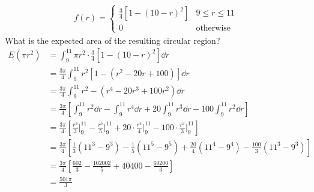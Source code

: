 \documentclass[letterpaper,12pt]{article}
\begin{document}
\begin{enumerate}
    \begin{align*}
      f(r) = \begin{cases}
        \frac{3}{4}[1 - (10 - r)^2] & 9 \le r \le 11 \\
        0                           & \text{otherwise}
      \end{cases}
    \end{align*}
    What is the expected area of the resulting circular region?
    \begin{align*}
      E(\pi r^2) &= \int_{9}^{11} \pi r^2 \cdot \frac{3}{4}[1 - (10 - r)^2] \dd{r} \\
      &= \frac{3\pi}{4} \int_{9}^{11} r^2 [1 - (r^2 - 20r + 100)] \dd{r} \\
      &= \frac{3\pi}{4} \int_{9}^{11} r^2 - (r^4 - 20r^3 + 100r^2) \dd{r} \\
      &= \frac{3\pi}{4} \left[\int_{9}^{11} r^2 \dd{r} - \int_{9}^{11} r^4 \dd{r} + 20\int_{9}^{11} r^3 \dd{r} - 100\int_{9}^{11} r^2 \dd{r}\right] \\
      &= \frac{3\pi}{4} \left[\frac{r^3}{3} \bigg\rvert_{9}^{11} - \frac{r^5}{5} \bigg\rvert_{9}^{11} + 20 \cdot \frac{r^4}{4} \bigg\rvert_{9}^{11} - 100 \cdot \frac{r^3}{3} \bigg\rvert_{9}^{11}\right] \\
      &= \frac{3\pi}{4} \left[\frac{1}{3}(11^3 - 9^3) - \frac{1}{5}(11^5 - 9^5) + \frac{20}{4}(11^4 - 9^4) - \frac{100}{3}(11^3 - 9^3)\right] \\
      &= \frac{3\pi}{4} \left[\frac{602}{3} - \frac{102002}{5} + 40400 - \frac{60200}{3}\right] \\
      &= \frac{501\pi}{3}
    \end{align*}
\end{enumerate}
\end{document}
